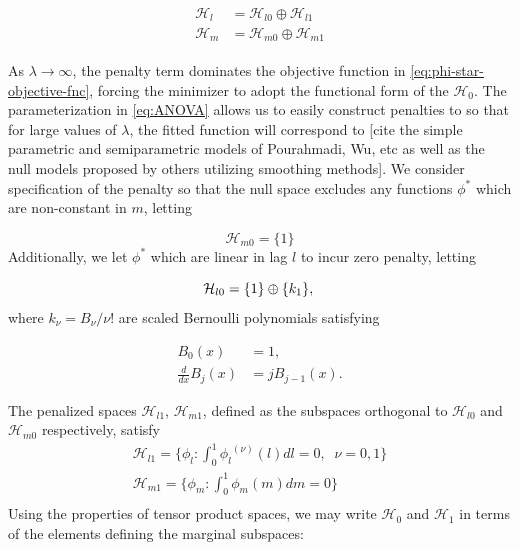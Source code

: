 \documentclass[12pt]{article}
\theoremstyle{definition}
\begin{document}
\begin{align}
\begin{split} \label{eq:}
\mathcal{H}_l &= \mathcal{H}_{l0} \oplus \mathcal{H}_{l1}\\
\mathcal{H}_m &= \mathcal{H}_{m0} \oplus \mathcal{H}_{m1}
\end{split}
\end{align}
\noindent

As $\lambda \rightarrow \infty$, the penalty term dominates the objective function in \ref{eq:phi-star-objective-fnc}, forcing the minimizer to adopt the functional form of the $\mathcal{H}_0$. The parameterization in \ref{eq:ANOVA} allows us to easily construct penalties to so that for large values of $\lambda$, the fitted function will correspond to [cite the simple parametric and semiparametric models of Pourahmadi, Wu, etc as well as the null models proposed by others utilizing smoothing methods]. We consider specification of the penalty so that the null space excludes any functions $\phi^*$ which are non-constant in $m$, letting 

\begin{equation} \label{eq:null_space_m}
\mathcal{H}_{m0} =  \lbrace  1 \rbrace
\end{equation}
\noindent
 Additionally, we let $\phi^*$ which are linear in lag $l$ to incur zero penalty, letting 

\begin{equation} \label{eq:null_space_l}
\mathcal{H}_{l0} =  \lbrace 1 \rbrace \oplus \lbrace k_1 \rbrace,\\
\end{equation}
\noindent
where $k_\nu = B_\nu/\nu!$ are scaled Bernoulli polynomials satisfying 

\begin{align*}
B_0\left(x\right) &= 1,\\
\frac{d}{dx} B_j\left(x\right) &= jB_{j-1}\left(x\right).
\end{align*}

The penalized spaces $\mathcal{H}_{l1}$, $\mathcal{H}_{m1}$, defined as the subspaces orthogonal to $\mathcal{H}_{l0}$ and $\mathcal{H}_{m0}$  respectively, satisfy
\begin{eqnarray*}
\mathcal{H}_{l1} = \lbrace \phi_l: \int_0^1 {\phi_l}^{\left( \nu \right)}\left(l\right) dl = 0,\;\; \nu = 0,1\rbrace\\
\mathcal{H}_{m1} = \lbrace \phi_m: \int_0^1 \phi_m \left(m\right) dm = 0 \rbrace\\
\end{eqnarray*}
\noindent
Using the properties of tensor product spaces, we may write $\mathcal{H}_0$ and $\mathcal{H}_1$ in terms of the elements defining the marginal subspaces:
\end{document}
